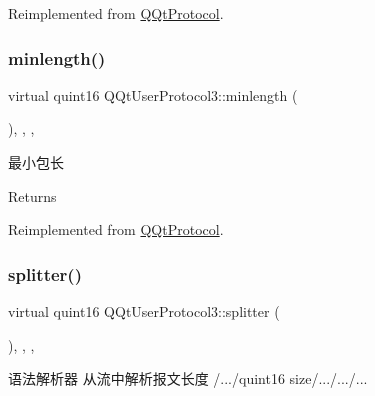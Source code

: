 Reimplemented from \mbox{\hyperlink{class_q_qt_protocol_af41bc3116abbbcfc9af45e151a253ff7}{Q\+Qt\+Protocol}}.

\mbox{\label{class_q_qt_user_protocol3_a210181f706de160bb3e4e3f0b8753ce6}} 
\subsubsection{\texorpdfstring{minlength()}{minlength()}}
{\footnotesize\ttfamily virtual quint16 Q\+Qt\+User\+Protocol3\+::minlength (\begin{DoxyParamCaption}{ }\end{DoxyParamCaption})\hspace{0.3cm}{\ttfamily [inline]}, {\ttfamily [override]}, {\ttfamily [protected]}, {\ttfamily [virtual]}}



最小包长 

\begin{DoxyReturn}{Returns}

\end{DoxyReturn}


Reimplemented from \mbox{\hyperlink{class_q_qt_protocol_a2b00f53d3dd0eed817eeecff422891f3}{Q\+Qt\+Protocol}}.

\mbox{\label{class_q_qt_user_protocol3_a783d99ec4be1296f1d83bec932934de9}} 
\subsubsection{\texorpdfstring{splitter()}{splitter()}}
{\footnotesize\ttfamily virtual quint16 Q\+Qt\+User\+Protocol3\+::splitter (\begin{DoxyParamCaption}\item[{const Q\+Byte\+Array \&}]{ }\end{DoxyParamCaption})\hspace{0.3cm}{\ttfamily [inline]}, {\ttfamily [override]}, {\ttfamily [protected]}, {\ttfamily [virtual]}}



语法解析器 从流中解析报文长度 /.../quint16 size/.../.../... 


